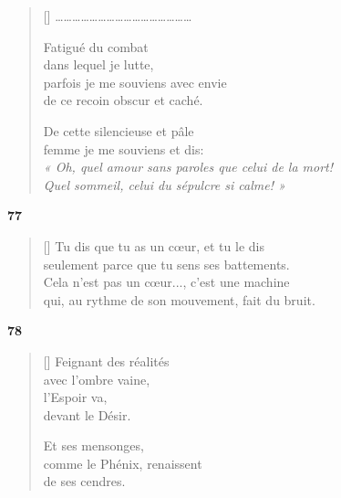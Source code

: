 \documentclass[a4paper,12pt]{book}
\begin{document}
\begin{verse}[\versewidth]
\ldots\ldots\ldots\ldots\ldots\ldots\ldots\ldots\ldots\ldots\ldots\ldots\ldots\ldots\ldots\ldots

  Fatigué du combat \\
  dans lequel je lutte, \\
  parfois je me souviens avec envie \\
  de ce recoin obscur et caché.

  De cette silencieuse et pâle \\
  femme je me souviens et dis: \\
  \emph{« Oh, quel amour sans paroles que celui de la mort! \\
    Quel sommeil, celui du sépulcre si calme! »}
\end{verse}

\bigskip

\begin{center}
  \textbf{77}
   \end{center}

\settowidth{\versewidth}{qui, au rythme de son mouvement, fait du bruit.}

\begin{verse}[\versewidth]
  Tu dis que tu as un cœur, et tu le dis \\
  seulement parce que tu sens ses battements. \\
  Cela n'est pas un cœur..., c'est une machine \\
  qui, au rythme de son mouvement, fait du bruit.
\end{verse}

\bigskip

\begin{center}
  \textbf{78}
\end{center}

\settowidth{\versewidth}{comme le Phénix, renaissent}

\begin{verse}[\versewidth]
  Feignant des réalités \\
  avec l'ombre vaine, \\
  l'Espoir va, \\
  devant le Désir.

  Et ses mensonges, \\
  comme le Phénix, renaissent \\
  de ses cendres.
\end{verse}
\end{document}
